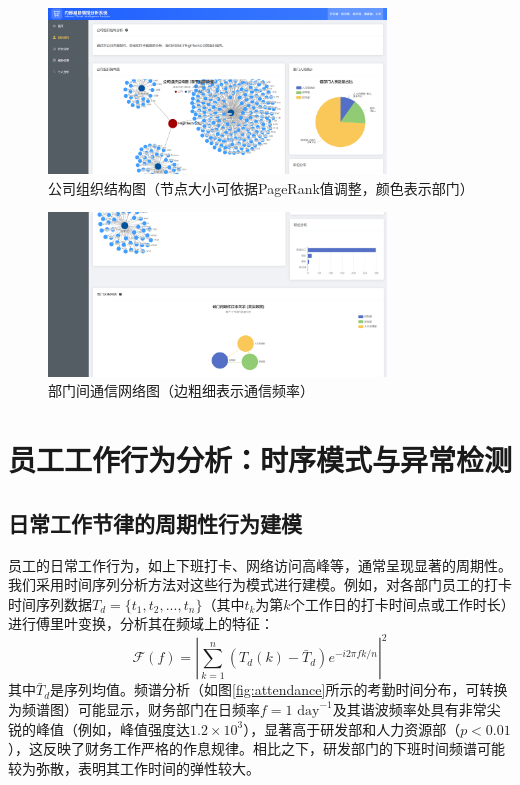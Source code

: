 \documentclass[UTF8,12pt]{ctexart}
\begin{document}
\begin{figure}[H]
    \centering
    \includegraphics[width=0.8\textwidth]{organization.png}
    \caption{公司组织结构图（节点大小可依据PageRank值调整，颜色表示部门）}
    \label{fig:organization}
\end{figure}

\begin{figure}[H]
    \centering
    \includegraphics[width=0.8\textwidth]{relation_network.png}
    \caption{部门间通信网络图（边粗细表示通信频率）}
    \label{fig:relation_network}
\end{figure}

\section{员工工作行为分析：时序模式与异常检测}
\subsection{日常工作节律的周期性行为建模}
员工的日常工作行为，如上下班打卡、网络访问高峰等，通常呈现显著的周期性。我们采用时间序列分析方法对这些行为模式进行建模。例如，对各部门员工的打卡时间序列数据$T_d = \{t_1, t_2, ..., t_n\}$（其中$t_k$为第$k$个工作日的打卡时间点或工作时长）进行傅里叶变换，分析其在频域上的特征：
\begin{equation}
\mathcal{F}(f) = \left|\sum_{k=1}^n (T_d(k) - \bar{T}_d) e^{-i2\pi fk/n}\right|^2
\end{equation}
其中$\bar{T}_d$是序列均值。频谱分析（如图\ref{fig:attendance}所示的考勤时间分布，可转换为频谱图）可能显示，财务部门在日频率$f=1 \text{ day}^{-1}$及其谐波频率处具有非常尖锐的峰值（例如，峰值强度达$1.2\times10^3$），显著高于研发部和人力资源部（$p<0.01$），这反映了财务工作严格的作息规律。相比之下，研发部门的下班时间频谱可能较为弥散，表明其工作时间的弹性较大。
\end{document}

